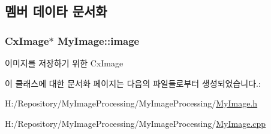 \subsection{멤버 데이타 문서화}
\hypertarget{class_my_image_a8ac6996526b9d73661c339db66680676}{
\subsubsection[{image}]{\setlength{\rightskip}{0pt plus 5cm}Cx\-Image$\ast$ My\-Image\-::image\hspace{0.3cm}{\ttfamily [private]}}}\label{class_my_image_a8ac6996526b9d73661c339db66680676}


이미지를 저장하기 위한 Cx\-Image 



이 클래스에 대한 문서화 페이지는 다음의 파일들로부터 생성되었습니다.\-:\begin{DoxyCompactItemize}
\item 
H\-:/\-Repository/\-My\-Image\-Processing/\-My\-Image\-Processing/\hyperlink{_my_image_8h}{My\-Image.\-h}\item 
H\-:/\-Repository/\-My\-Image\-Processing/\-My\-Image\-Processing/\hyperlink{_my_image_8cpp}{My\-Image.\-cpp}\end{DoxyCompactItemize}
